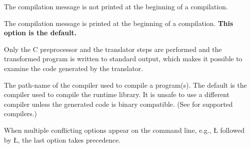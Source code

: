 \documentclass[openright,twoside]{report}
\begin{document}
\begin{prefix}
\item[\LGinlinetrue\LGbegin\lgrinde\L{\LB{\-\V{quiet}}}\endlgrinde\LGend{}]
%
The \uC compilation message is not printed at the beginning of a compilation.

\item[\LGinlinetrue\LGbegin\lgrinde\L{\LB{\-\V{noquiet}}}\endlgrinde\LGend{}]
%
The \uC compilation message is printed at the beginning of a compilation.
\textbf{This option is the default.}

\item[\LGinlinetrue\LGbegin\lgrinde\L{\LB{\-\V{U}++}}\endlgrinde\LGend{}]
%
Only the C preprocessor and the \uC translator steps are performed and the transformed program is written to standard output, which makes it possible to examine the code generated by the \uC translator.

\item[\LGinlinetrue\LGbegin\lgrinde\L{\LB{\-\V{compiler}}}\endlgrinde\LGend{} path-name]
%
The path-name of the compiler used to compile a \uC program(s).
The default is the compiler used to compile the \uC runtime library.
It is unsafe to use a different compiler unless the generated code is binary compatible.
(See  for supported compilers.)

\end{prefix}
When multiple conflicting options appear on the command line, e.g., \LGinlinetrue\LGbegin\lgrinde\L{}\endlgrinde\LGend{} followed by \LGinlinetrue\LGbegin\lgrinde\L{}\endlgrinde\LGend{}, the last option takes precedence.
\end{document}
